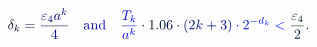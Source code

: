 \documentclass[12pt]{article}
\begin{document}
\makeatletter
\renewcommand*{\@textcolor}[3]{%
  \protect\leavevmode
  \begingroup
    \color#1{#2}#3%
  \endgroup
}
\makeatother
\begin{displaymath}
\mathcolor[RGB]{0,0,15}{\delta} _ { \mathcolor[RGB]{0,0,30}{k} } \mathcolor[RGB]{0,0,45}{=} \mathcolor[RGB]{0,0,60}{\frac { \mathcolor[RGB]{0,0,75}{\varepsilon} _ { \mathcolor[RGB]{0,0,90}{4} } \mathcolor[RGB]{0,0,105}{a} ^ { \mathcolor[RGB]{0,0,120}{k} } } { \mathcolor[RGB]{0,0,135}{4} } } \quad \mathrm { \mathcolor[RGB]{0,0,150}{a} \mathcolor[RGB]{0,0,165}{n} \mathcolor[RGB]{0,0,180}{d} } \quad \mathcolor[RGB]{0,0,195}{\frac { \mathcolor[RGB]{0,0,210}{T} _ { \mathcolor[RGB]{0,0,225}{k} } } { \mathcolor[RGB]{0,0,240}{a} ^ { \mathcolor[RGB]{0,0,255}{k} } } } \mathcolor[RGB]{0,15,0}{\cdot} \mathcolor[RGB]{0,15,15}{1} \mathcolor[RGB]{0,15,30}{.} \mathcolor[RGB]{0,15,45}{0} \mathcolor[RGB]{0,15,60}{6} \mathcolor[RGB]{0,15,75}{\cdot} \mathcolor[RGB]{0,15,90}{(} \mathcolor[RGB]{0,15,105}{2} \mathcolor[RGB]{0,15,120}{k} \mathcolor[RGB]{0,15,135}{+} \mathcolor[RGB]{0,15,150}{3} \mathcolor[RGB]{0,15,165}{)} \mathcolor[RGB]{0,15,180}{\cdot} \mathcolor[RGB]{0,15,195}{2} ^ { \mathcolor[RGB]{0,15,210}{-} \mathcolor[RGB]{0,15,225}{d} _ { \mathcolor[RGB]{0,15,240}{k} } } \mathcolor[RGB]{0,15,255}{<} \mathcolor[RGB]{0,30,0}{\frac { \mathcolor[RGB]{0,30,15}{\varepsilon} _ { \mathcolor[RGB]{0,30,30}{4} } } { \mathcolor[RGB]{0,30,45}{2} } } \mathcolor[RGB]{0,30,60}{.}
\end{displaymath}
\end{document}
